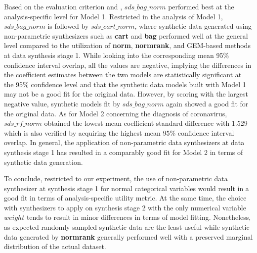 Based on the evaluation criterion and , $sds\_bag\_norm$ performed best at the analysis-specific level for Model 1. Restricted in the analysis of Model 1, 
$sds\_bag\_norm$ is followed by $sds\_cart\_norm$, where synthetic data generated using non-parametric synthesizers such as \textbf{cart} and \textbf{bag} performed well at 
the general level compared to the utilization of \textbf{norm}, \textbf{normrank}, and GEM-based methods at data synthesis stage 1. While looking into the corresponding mean 95\% confidence 
interval overlap, all the values are negative, implying the differences in the coefficient estimates between the two models are statistically significant at the 95\% confidence level and that 
the synthetic data models built with Model 1 may not be a good fit for the original data. However, by scoring with the largest negative value, synthetic models fit by 
$sds\_bag\_norm$ again showed a good fit for the original data. As for Model 2 concerning the diagnosis of coronavirus, $sds\_rf\_norm$ obtained the lowest mean 
coefficient standard difference with 1.529 which is also verified by acquiring the highest mean 95\% confidence interval overlap. In general, the application of non-parametric data synthesizers 
at data synthesis stage 1 has resulted in a comparably good fit for Model 2 in terms of synthetic data generation.

To conclude, restricted to our experiment, the use of non-parametric data synthesizer at synthesis stage 1 for normal categorical variables would result in a good fit in terms of 
analysis-specific utility metric. At the same time, the choice with synthesizers to apply on synthesis stage 2 with the only numerical variable $weight$ tends to result in 
minor differences in terms of model fitting. Nonetheless, as expected randomly sampled synthetic data are the least useful while synthetic data generated by \textbf{normrank} generally 
performed well with a preserved marginal distribution of the actual dataset.

\newpage
